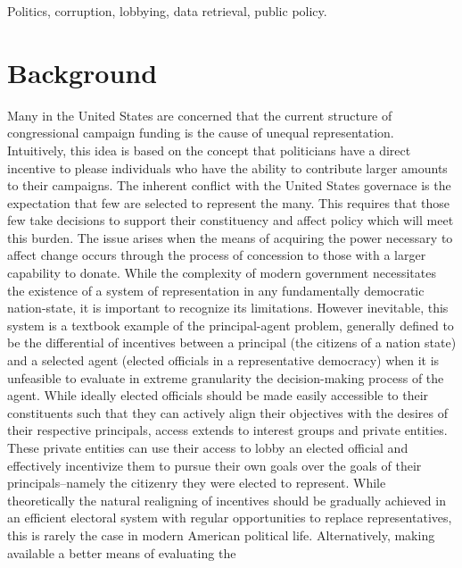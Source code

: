 \documentclass[journal]{IEEEtran}
\begin{document}
\begin{IEEEkeywords}
Politics, corruption, lobbying, data retrieval, public policy.
\end{IEEEkeywords}

\IEEEpeerreviewmaketitle



\section{Background}
Many in the United States are concerned that the current structure of congressional campaign funding is the cause of 
unequal representation. Intuitively, this idea is based on the concept that politicians have a direct incentive to please
individuals who have the ability to contribute larger amounts to their campaigns. The inherent conflict with the United States governace is the expectation that few are selected
to represent the many. This requires that those few take decisions to support their constituency and affect policy which
will meet this burden. The issue arises when the means of acquiring the power necessary to affect change occurs through 
the process of concession to those with a larger capability to donate.
While the complexity of modern government necessitates the existence of a system of representation in any fundamentally 
democratic nation-state, it is important to recognize its limitations. However inevitable, this system is a textbook 
example of the principal-agent problem, generally defined to be the differential of incentives between a principal (the 
citizens of a nation state) and a selected agent (elected officials in a representative democracy) when it is unfeasible 
to evaluate in extreme granularity the decision-making process of the agent. While ideally elected officials should be 
made easily accessible to their constituents such that they can actively align their objectives with the desires of their 
respective principals, access extends to interest groups and private entities. These private entities can use their 
access to lobby an elected official and effectively incentivize them to pursue their own goals over the goals of their 
principals--namely the citizenry they were elected to represent. While theoretically the natural realigning of incentives 
should be gradually achieved in an efficient electoral system with regular opportunities to replace representatives, this 
is rarely the case in modern American political life. Alternatively, making available a better means of evaluating the 
\end{document}
